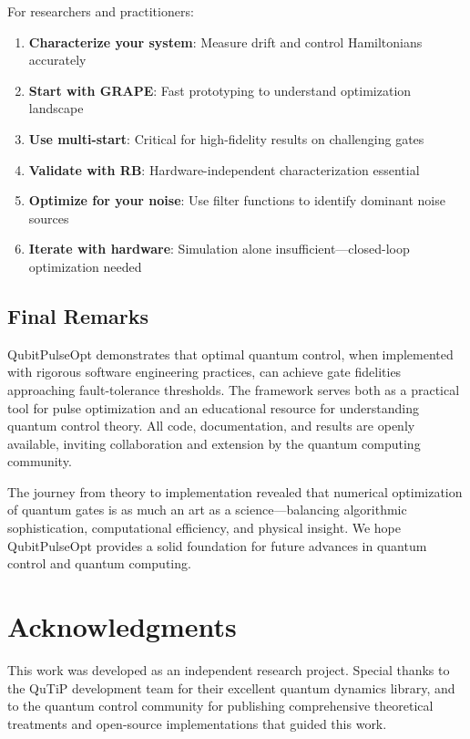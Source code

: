 \documentclass[11pt,a4paper]{article}
\theoremstyle{definition}
\theoremstyle{remark}
\begin{document}
For researchers and practitioners:

\begin{enumerate}
    \item \textbf{Characterize your system}: Measure drift and control Hamiltonians accurately
    \item \textbf{Start with GRAPE}: Fast prototyping to understand optimization landscape
    \item \textbf{Use multi-start}: Critical for high-fidelity results on challenging gates
    \item \textbf{Validate with RB}: Hardware-independent characterization essential
    \item \textbf{Optimize for your noise}: Use filter functions to identify dominant noise sources
    \item \textbf{Iterate with hardware}: Simulation alone insufficient—closed-loop optimization needed
\end{enumerate}

\subsection{Final Remarks}

QubitPulseOpt demonstrates that optimal quantum control, when implemented with rigorous software engineering practices, can achieve gate fidelities approaching fault-tolerance thresholds. The framework serves both as a practical tool for pulse optimization and an educational resource for understanding quantum control theory. All code, documentation, and results are openly available, inviting collaboration and extension by the quantum computing community.

The journey from theory to implementation revealed that numerical optimization of quantum gates is as much an art as a science—balancing algorithmic sophistication, computational efficiency, and physical insight. We hope QubitPulseOpt provides a solid foundation for future advances in quantum control and quantum computing.

\section*{Acknowledgments}

This work was developed as an independent research project. Special thanks to the QuTiP development team for their excellent quantum dynamics library, and to the quantum control community for publishing comprehensive theoretical treatments and open-source implementations that guided this work.
\end{document}
